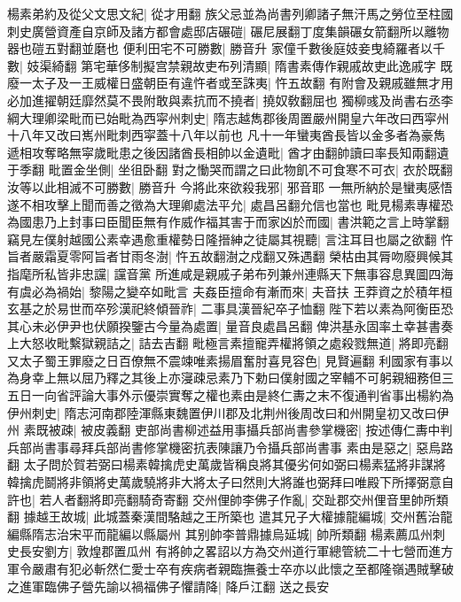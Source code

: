 楊素弟約及從父文思文紀|{
	從才用翻}
族父忌並為尚書列卿諸子無汗馬之勞位至柱國刺史廣營資產自京師及諸方都會處邸店碾磑|{
	碾尼展翻丁度集韻碾女箭翻所以離物器也磑五對翻並磨也}
便利田宅不可勝數|{
	勝音升}
家僮千數後庭妓妾曳綺羅者以千數|{
	妓渠綺翻}
第宅華侈制擬宫禁親故吏布列清顯|{
	隋書素傳作親戚故吏此逸戚字}
既廢一太子及一王威權日盛朝臣有違忤者或至誅夷|{
	忤五故翻}
有附會及親戚雖無才用必加進擢朝廷靡然莫不畏附敢與素抗而不撓者|{
	撓奴敎翻屈也}
獨柳彧及尚書右丞李綱大理卿梁毗而已始毗為西寜州刺史|{
	隋志越雋郡後周置嚴州開皇六年改曰西寜州十八年又改曰嶲州毗刺西寜蓋十八年以前也}
凡十一年蠻夷酋長皆以金多者為豪雋遞相攻奪略無寜歲毗患之後因諸酋長相帥以金遺毗|{
	酋才由翻帥讀曰率長知兩翻遺于季翻}
毗置金坐側|{
	坐徂卧翻}
對之慟哭而謂之曰此物飢不可食寒不可衣|{
	衣於既翻}
汝等以此相滅不可勝數|{
	勝音升}
今將此來欲殺我邪|{
	邪音耶}
一無所納於是蠻夷感悟遂不相攻擊上聞而善之徵為大理卿處法平允|{
	處昌呂翻允信也當也}
毗見楊素專權恐為國患乃上封事曰臣聞臣無有作威作福其害于而家凶於而國|{
	書洪範之言上時掌翻}
竊見左僕射越國公素幸遇愈重權勢日隆搢紳之徒屬其視聽|{
	言注耳目也屬之欲翻}
忤旨者嚴霜夏零阿旨者甘雨冬澍|{
	忤五故翻澍之戍翻又殊遇翻}
榮枯由其脣吻廢興候其指麾所私皆非忠讜|{
	讜音黨}
所進咸是親戚子弟布列兼州連縣天下無事容息異圖四海有虞必為禍始|{
	黎陽之變卒如毗言}
夫姦臣擅命有漸而來|{
	夫音扶}
王莽資之於積年桓玄基之於易世而卒殄漢祀終傾晉祚|{
	二事具漢晉紀卒子恤翻}
陛下若以素為阿衡臣恐其心未必伊尹也伏願揆鑒古今量為處置|{
	量音良處昌呂翻}
俾洪基永固率土幸甚書奏上大怒收毗繫獄親詰之|{
	詰去吉翻}
毗極言素擅寵弄權將領之處殺戮無道|{
	將即亮翻}
又太子蜀王罪廢之日百僚無不震竦唯素揚眉奮肘喜見容色|{
	見賢遍翻}
利國家有事以為身幸上無以屈乃釋之其後上亦寖疎忌素乃下勅曰僕射國之宰輔不可躬親細務但三五日一向省評論大事外示優崇實奪之權也素由是終仁夀之末不復通判省事出楊約為伊州刺史|{
	隋志河南郡陸渾縣東魏置伊川郡及北荆州後周改曰和州開皇初又改曰伊州}
素既被疎|{
	被皮義翻}
吏部尚書柳述益用事攝兵部尚書參掌機密|{
	按述傳仁夀中判兵部尚書事尋拜兵部尚書修掌機密抗表陳讓乃令攝兵部尚書事}
素由是惡之|{
	惡烏路翻}
太子問於賀若弼曰楊素韓擒虎史萬歲皆稱良將其優劣何如弼曰楊素猛將非謀將韓擒虎鬬將非領將史萬歲驍將非大將太子曰然則大將誰也弼拜曰唯殿下所擇弼意自許也|{
	若人者翻將即亮翻騎奇寄翻}
交州俚帥李佛子作亂|{
	交趾郡交州俚音里帥所類翻}
據越王故城|{
	此城蓋秦漢間駱越之王所築也}
遣其兄子大權據龍編城|{
	交州舊治龍編縣隋志治宋平而龍編以縣屬州}
其别帥李普鼎據烏延城|{
	帥所類翻}
楊素薦瓜州刺史長安劉方|{
	敦煌郡置瓜州}
有將帥之畧詔以方為交州道行軍總管統二十七營而進方軍令嚴肅有犯必斬然仁愛士卒有疾病者親臨撫養士卒亦以此懷之至都隆嶺遇賊擊破之進軍臨佛子營先諭以禍福佛子懼請降|{
	降戶江翻}
送之長安

